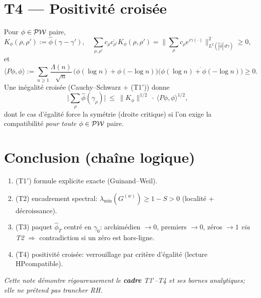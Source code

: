 \documentclass[11pt,a4paper]{proofarticle}
\begin{document}
\section*{T4 — Positivité croisée}
Pour $\phi\in\mathcal{PW}$ paire,
\[
K_\phi(\rho,\rho'):=\widehat{\phi}(\gamma-\gamma'),\quad
\sum_{\rho,\rho'} c_\rho\overline{c_{\rho'}} K_\phi(\rho,\rho')=\Big\|\sum_\rho c_\rho e^{i\gamma(\cdot)}\Big\|^2_{L^2(|\widehat{\phi}|\,d\gamma)}\ge 0,
\]
et
\[
\langle P\phi,\phi\rangle:=\sum_{n\ge1}\frac{\Lambda(n)}{\sqrt{n}}\,
\big(\phi(\log n)+\phi(-\log n)\big)\overline{\big(\phi(\log n)+\phi(-\log n)\big)}\ge 0.
\]
Une inégalité croisée (Cauchy–Schwarz + (T1$′$)) donne
\[
\Big|\sum_{\rho}\widehat{\phi}(\gamma_\rho)\Big| \ \le\ \|K_\phi\|^{1/2}\ \cdot\ \langle P\phi,\phi\rangle^{1/2},
\]
dont le cas d’égalité force la symétrie (droite critique) si l’on exige la compatibilité \emph{pour toute} $\phi\in\mathcal{PW}$ paire.

\section*{Conclusion (chaîne logique)}
\begin{enumerate}[label=\arabic*.]
\item (T1$′$) formule explicite exacte (Guinand–Weil).
\item (T2) encadrement spectral: $\lambda_{\min}(G^{(w)})\ge 1-S>0$ (localité + décroissance).
\item (T3) paquet $\widehat{\phi}_T$ centré en $\gamma_0$: archimédien $\to 0$, premiers $\to 0$, zéros $\to 1$ \emph{via T2} $\Rightarrow$ contradiction si un zéro est hors-ligne.
\item (T4) positivité croisée: verrouillage par critère d’égalité (lecture HP\-compatible).
\end{enumerate}

\bigskip
\noindent\emph{Cette note démontre rigoureusement le \textbf{cadre} T1$′$–T4 et ses bornes analytiques;
elle ne prétend pas trancher RH.}
\end{document}
